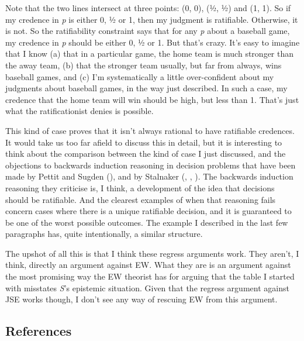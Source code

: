 \documentclass[
  10pt,
  letterpaper,
  DIV=11,
  numbers=noendperiod,
  twoside]{scrartcl}
\begin{document}
Note that the two lines intersect at three points: (0, 0), (½, ½) and
(1, 1). So if my credence in \emph{p} is either 0, ½ or 1, then my
judgment is ratifiable. Otherwise, it is not. So the ratifiability
constraint says that for any \emph{p} about a baseball game, my credence
in \emph{p} should be either 0, ½ or 1. But that's crazy. It's easy to
imagine that I know (a) that in a particular game, the home team is much
stronger than the away team, (b) that the stronger team usually, but far
from always, wins baseball games, and (c) I'm systematically a little
over-confident about my judgments about baseball games, in the way just
described. In such a case, my credence that the home team will win
should be high, but less than 1. That's just what the ratificationist
denies is possible.

This kind of case proves that it isn't always rational to have
ratifiable credences. It would take us too far afield to discuss this in
detail, but it is interesting to think about the comparison between the
kind of case I just discussed, and the objections to backwards induction
reasoning in decision problems that have been made by Pettit and Sugden
(), and by Stalnaker
(, ,
). The backwards induction reasoning
they criticise is, I think, a development of the idea that decisions
should be ratifiable. And the clearest examples of when that reasoning
fails concern cases where there is a unique ratifiable decision, and it
is guaranteed to be one of the worst possible outcomes. The example I
described in the last few paragraphs has, quite intentionally, a similar
structure.

The upshot of all this is that I think these regress arguments work.
They aren't, I think, directly an argument against EW. What they are is
an argument against the most promising way the EW theorist has for
arguing that the table I started with misstates \emph{S}'s epistemic
situation. Given that the regress argument against JSE works though, I
don't see any way of rescuing EW from this argument.

\subsection*{References}\label{references}
\end{document}
